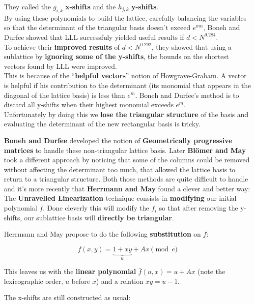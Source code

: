 \documentclass[a4paper,11pt]{article}
\begin{document}
They called the $g_{i,k}$ \textbf{x-shifts} and the $h_{j,k}$ \textbf{y-shifts}.\\

By using these polynomials to build the lattice, carefully balancing the variables so that the determinant of the triangular basis doesn't exceed $e^{mn}$, Boneh and Durfee showed that LLL successfuly yielded useful results if $d < N^{0.284}$.\\

To achieve their \textbf{improved results} of $d < N^{0.292}$, they showed that using a sublattice by \textbf{ignoring some of the y-shifts}, the bounds on the shortest vectors found by LLL were improved.\\
This is because of the ``\textbf{helpful vectors}'' notion of Howgrave-Graham. A vector is helpful if his contribution to the determinant (its monomial that appears in the diagonal of the lattice basis) is less than $e^m$. Boneh and Durfee's method is to discard all y-shifts when their highest monomial exceeds $e^m$.\\
Unfortunately by doing this we \textbf{lose the triangular structure} of the basis and evaluating the determinant of the new rectangular basis is tricky.

\textbf{Boneh and Durfee} developed the notion of \textbf{Geometrically progressive matrices} to handle these non-triangular lattice basis. Later \textbf{Blömer and May} took a different approach by noticing that some of the columns could be removed without affecting the determinant too much, that allowed the lattice basis to return to a triangular structure. Both those methods are quite difficult to handle and it's more recently that \textbf{Herrmann and May} found a clever and better way:\\

The \textbf{Unravelled Linearization} technique consists in \textbf{modifying} our initial polynomial $f$. Done cleverly this will modify the $f_i$ so that after removing the y-shifts, our sublattice basis will \textbf{directly be triangular}.

Herrmann and May propose to do the following \textbf{substitution} on $f$:

\[ f(x,y)=\underbrace{1 + xy}_u + Ax \pmod{e} \]

This leaves us with the \textbf{linear polynomial} $\bar{f}(u, x) = u + Ax$ (note the lexicographic order, $u$ before $x$) and a relation $xy = u - 1$.

The x-shifts are still constructed as usual:
\end{document}
